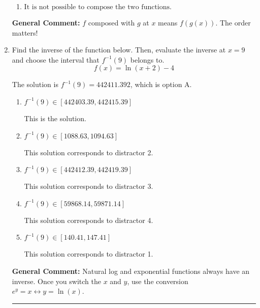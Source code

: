 \documentclass{extbook}[14pt]
\newcommand{\litem}[1]{\item #1

\rule{\textwidth}{0.4pt}}
\begin{document}
\begin{enumerate}
{\begin{enumerate}[label=\Alph*.]
 Distractor 1: Corresponds to reversing the composition.
\item \( \text{It is not possible to compose the two functions.} \)


\end{enumerate}

\textbf{General Comment:} $f$ composed with $g$ at $x$ means $f(g(x))$. The order matters!
}
\litem{
Find the inverse of the function below. Then, evaluate the inverse at $x = 9$ and choose the interval that $f^{-1}(9)$ belongs to.
\[ f(x) = \ln{(x+2)}-4 \]

The solution is \( f^{-1}(9) = 442411.392 \), which is option A.\begin{enumerate}[label=\Alph*.]
\item \( f^{-1}(9) \in [442403.39, 442415.39] \)

 This is the solution.
\item \( f^{-1}(9) \in [1088.63, 1094.63] \)

 This solution corresponds to distractor 2.
\item \( f^{-1}(9) \in [442412.39, 442419.39] \)

 This solution corresponds to distractor 3.
\item \( f^{-1}(9) \in [59868.14, 59871.14] \)

 This solution corresponds to distractor 4.
\item \( f^{-1}(9) \in [140.41, 147.41] \)

 This solution corresponds to distractor 1.
\end{enumerate}

\textbf{General Comment:} Natural log and exponential functions always have an inverse. Once you switch the $x$ and $y$, use the conversion $ e^y = x \leftrightarrow y=\ln(x)$.
}
\end{enumerate}
\end{document}

